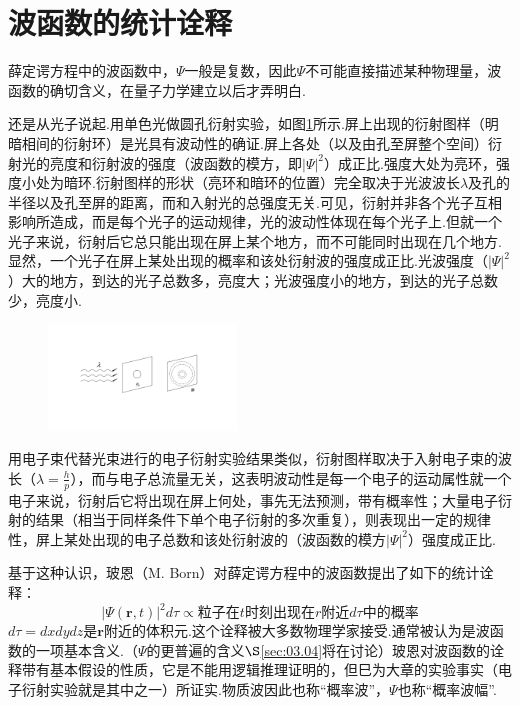 \section[波函数的统计诠释]{波函数的统计诠释} \label{sec:02.02} %

薛定谔方程中的波函数中，$\varPsi$一般是复数，因此$\varPsi$不可能直接描述某种物理量，波函数的确切含义，在量子力学建立以后才弄明白.

还是从光子说起.用单色光做圆孔衍射实验，如图\ref{fig.2-1}所示.屏上出现的衍射图样（明暗相间的衍射环）是光具有波动性的确证.屏上各处（以及由孔至屏整个空间）衍射光的亮度和衍射波的强度（波函数的模方，即$|\varPsi|^{2}$）成正比.强度大处为亮环，强度小处为暗环.衍射图样的形状（亮环和暗环的位置）完全取决于光波波长$\lambda$及孔的半径以及孔至屏的距离，而和入射光的总强度无关.可见，衍射并非各个光子互相影响所造成，而是每个光子的运动规律，光的波动性体现在每个光子上.但就一个光子来说，衍射后它总只能出现在屏上某个地方，而不可能同时出现在几个地方.显然，一个光子在屏上某处出现的概率和该处衍射波的强度成正比.光波强度（$|\varPsi|^{2}$）大的地方，到达的光子总数多，亮度大；光波强度小的地方，到达的光子总数少，亮度小.
\begin{figure}[!h]
	\centering
	\includegraphics[width=5cm,clip]{QM file/figure/2-1}
	\caption{}\label{fig.2-1}
\end{figure}

用电子束代替光束进行的电子衍射实验结果类似，衍射图样取决于入射电子束的波长（$\lambda=\frac{h}{p}$），而与电子总流量无关，这表明波动性是每一个电子的运动属性就一个电子来说，衍射后它将出现在屏上何处，事先无法预测，带有概率性；大量电子衍射的结果（相当于同样条件下单个电子衍射的多次重复），则表现出一定的规律性，屏上某处出现的电子总数和该处衍射波的（波函数的模方$|\varPsi|^{2}$）强度成正比.

基于这种认识，玻恩（M. Born）对薛定谔方程中的波函数提出了如下的统计诠释：
\eqlong
\begin{equation*}
	|\varPsi(\boldsymbol{r},t)|^{2} d\tau \propto \text{粒子在}t\text{时刻出现在}r\text{附近}d\tau\text{中的概率}
\end{equation*}
$d\tau=dxdydz$是$\boldsymbol{r}$附近的体积元.这个诠释被大多数物理学家接受.通常被认为是波函数的一项基本含义.（$\varPsi$的更普遍的含义$\S$\ref{sec:03.04}将在讨论）玻恩对波函数的诠释带有基本假设的性质，它是不能用逻辑推理证明的，但巳为大章的实验事实（电子衍射实验就是其中之一）所证实.物质波因此也称“概率波”，$\varPsi$也称“概率波幅”.

